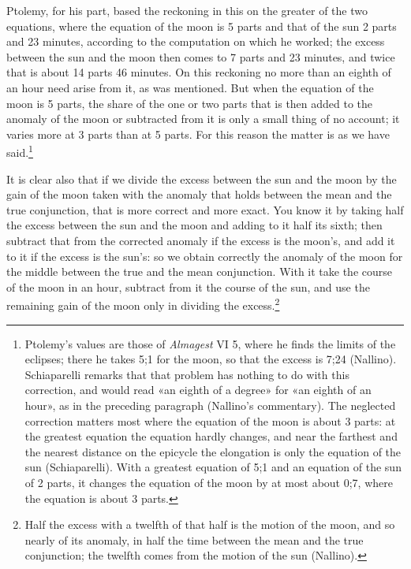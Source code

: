 \documentclass[11pt]{article}
\newcommand{\ArPage}[1]{\marginpar{\footnotesize\color{gray}Ar.\,p.\,#1}}
\begin{document}
\par Ptolemy, for his part, based the reckoning in this on the greater of the two equations, where the equation of the moon is 5 parts and that of the sun 2 parts and 23 minutes, according to the computation on which he worked; the excess between the sun and the moon then comes to 7 parts and 23 minutes, and twice that is about 14 parts 46 minutes. On this reckoning no more than an eighth of an hour need arise from it, as was mentioned. But when the equation of the moon is 5 parts, the share of the one or two parts that is then added to the anomaly of the moon or subtracted from it is only a small thing of no account; it varies more at 3 parts than at 5 parts. For this reason the matter is as we have said.\footnote{Ptolemy's values are those of \emph{Almagest} VI 5, where he finds the limits of the eclipses; there he takes 5;1 for the moon, so that the excess is 7;24 (Nallino). Schiaparelli remarks that that problem has nothing to do with this correction, and would read «an eighth of a degree» for «an eighth of an hour», as in the preceding paragraph (Nallino's commentary). The neglected correction matters most where the equation of the moon is about 3 parts: at the greatest equation the equation hardly changes, and near the farthest and the nearest distance on the epicycle the elongation is only the equation of the sun (Schiaparelli). With a greatest equation of 5;1 and an equation of the sun of 2 parts, it changes the equation of the moon by at most about 0;7, where the equation is about 3 parts.}\par
\par \ArPage{145}It is clear also that if we divide the excess between the sun and the moon by the gain of the moon taken with the anomaly that holds between the mean and the true conjunction, that is more correct and more exact. You know it by taking half the excess between the sun and the moon and adding to it half its sixth; then subtract that from the corrected anomaly if the excess is the moon's, and add it to it if the excess is the sun's: so we obtain correctly the anomaly of the moon for the middle between the true and the mean conjunction. With it take the course of the moon in an hour, subtract from it the course of the sun, and use the remaining gain of the moon only in dividing the excess.\footnote{Half the excess with a twelfth of that half is the motion of the moon, and so nearly of its anomaly, in half the time between the mean and the true conjunction; the twelfth comes from the motion of the sun (Nallino).}\par
\end{document}

